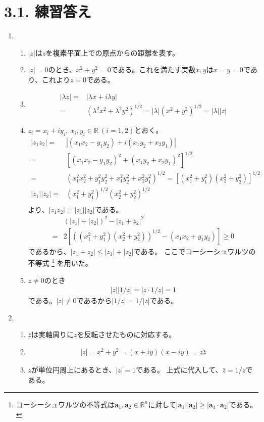 \documentclass{jreport}
\begin{document}
\section*{3.1. 練習答え}
\begin{enumerate}[label=\textbf{\arabic*.}]
\item
\begin{enumerate}
\item $|z|$は$z$を複素平面上での原点からの距離を表す。
\item $|z|=0$のとき、$x^{2}+y^{2}=0$である。これを満たす実数$x,y$は$x=y=0$であり、これより$z=0$である。
\item \begin{align*}
|\lambda z|=&|\lambda x+i\lambda y|\\
=&(\lambda^{2}x^{2}+\lambda^{2}y^{2})^{1/2}
=|\lambda|(x^{2}+y^{2})^{1/2}=|\lambda||z|
\end{align*}
\item $z_{i}=x_{i}+iy_{i},\ x_{i},y_{i}\in\mathbb{R}\ (i=1,2)$とおく。
\begin{align*}
|z_{1}z_{2}|=&|(x_{1}x_{2}-y_{1}y_{2})+i(x_{1}y_{2}+x_{2}y_{1})|\\
=&[(x_{1}x_{2}-y_{1}y_{2})^{2}+(x_{1}y_{2}+x_{2}y_{1})^{2}]^{1/2}\\
=&(x_{1}^{2}x_{2}^{2}+y_{1}^{2}y_{2}^{2}+x_{1}^{2}y_{2}^{2}+x_{2}^{2}y_{1}^{2})^{1/2}
=[(x_{1}^{2}+y_{1}^{2})(x_{2}^{2}+y_{2}^{2})]^{1/2}\\
|z_{1}||z_{2}|=&(x_{1}^{2}+y_{1}^{2})^{1/2}(x_{2}^{2}+y_{2}^{2})^{1/2}\\
\end{align*}
より、$|z_{1}z_{2}|=|z_{1}||z_{2}|$である。
\begin{align*}
&(|z_{1}|+|z_{2}|)^{2}-|z_{1}+z_{2}|^{2}\\
=&2[((x_{1}^{2}+y_{1}^{2})(x_{2}^{2}+y_{2}^{2}))^{1/2}-(x_{1}x_{2}+y_{1}y_{2})]\geq0
\end{align*}
であるから、$|z_{1}+z_{2}|\leq|z_{1}|+|z_{2}|$である。
ここでコーシーシュワルツの不等式
\footnote{コーシーシュワルツの不等式は$\mathbf{a}_{1},\mathbf{a}_{2}\in\mathbb{R}^{n}$に対して$|\mathbf{a}_{1}||\mathbf{a}_{2}|\geq|\mathbf{a}_{1}\cdot\mathbf{a}_{2}|$である。}
を用いた。
\item $z\ne0$のとき
\begin{align*}
|z||1/z|=|z\cdot 1/z|=1
\end{align*}
である。$|z|\ne0$であるから$|1/z|=1/|z|$である。
\end{enumerate}
\item
\begin{enumerate}
\item $\bar{z}$は実軸周りに$z$を反転させたものに対応する。
\item 
\begin{align*}
|z|=x^{2}+y^{2}=(x+iy)(x-iy)=z\bar{z}
\end{align*}
\item $z$が単位円周上にあるとき、$|z|=1$である。
上式に代入して、$\bar{z}=1/z$である。
\end{enumerate}
\end{enumerate}
\end{document}
